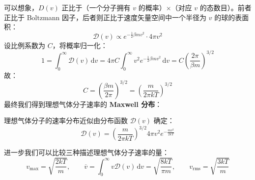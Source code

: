 可以想象，$D(v)$ 正比于（一个分子拥有 $v$ 的概率）$\times$（对应 $v$ 的态数目）。前者正比于 Boltzmann 因子，后者则正比于速度矢量空间中一个半径为 $v$ 的球的表面积：
\begin{equation}
    \mathcal{D}(v)\propto e^{-\frac{1}{2}\beta mv^2}\cdot4\pi v^2
\end{equation}
设比例系数为 $C$，将概率归一化：
\begin{equation}
    1=\int_0^{\infty}\mathcal{D}(v)\,\mathrm{d}v
    =4\pi C\int_0^{\infty}v^2e^{-\frac{1}{2}\beta mv^2}\,\mathrm{d}v
    = C\left(\frac{2\pi}{\beta m}\right)^{3/2}
\end{equation}
故：
\begin{equation}
    C=\left(\frac{\beta m}{2\pi}\right)^{3/2}=\left(\frac{m}{2\pi kT}\right)^{3/2}
\end{equation}
最终我们得到理想气体分子速率的 \textbf{Maxwell 分布}：
\begin{corollary}[Maxwell 分布]
    理想气体分子的速率分布近似由分布函数 $\mathcal{D}(v)$ 确定：
    \begin{equation}
        \mathcal{D}(v) = \left(\frac{m}{2\pi kT}\right)^{3/2}4\pi v^2e^{-\frac{mv^2}{2kT}}
    \end{equation}
\end{corollary}

进一步我们可以比较三种描述理想气体分子速率的量：
\begin{equation}
v_{\max}=\sqrt{\frac{2kT}{m}},\qquad
\overline v=\int_0^{\infty}v\mathcal{D}(v)\,\mathrm{d}v=\sqrt{\frac{8kT}{\pi m}},\qquad
v_{\mathrm{rms}}=\sqrt{\frac{3kT}{m}}
\end{equation}



